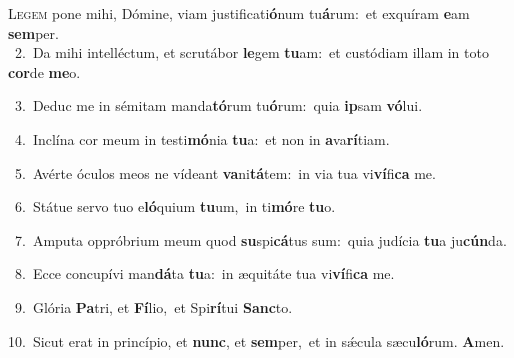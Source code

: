 \lettrine{\initial\textcolor{\initialcolor}{L}}{egem} pone mihi, Dómine, viam justificati\-\textbf{ó}\-num tu\-\textbf{á}\-rum:~\star et exquíram \textbf{e}\-am \textbf{sem}\-per.\\
{\numbfont\textcolor{\numbcolor}{~2.}}~Da mihi intelléctum, et scrutábor \textbf{le}\-gem \textbf{tu}\-am:~\star et custódiam illam in toto \textbf{cor}\-de \textbf{me}\-o.\par
{\numbfont\textcolor{\numbcolor}{~3.}}~Deduc me in sémitam manda\-\textbf{tó}\-rum tu\-\textbf{ó}\-rum:~\star quia \textbf{ip}\-sam \textbf{vó}\-lui.\par
{\numbfont\textcolor{\numbcolor}{~4.}}~Inclína cor meum in testi\-\textbf{mó}\-nia \textbf{tu}\-a:~\star et non in \textbf{a}\-va\-\textbf{rí}\-tiam.\par
{\numbfont\textcolor{\numbcolor}{~5.}}~Avérte óculos meos ne vídeant \textbf{va}\-ni\-\textbf{tá}\-tem:~\star in via tua vi\-\textbf{ví}\-fi\textbf{ca} me.\par
{\numbfont\textcolor{\numbcolor}{~6.}}~Státue servo tuo e\-\textbf{ló}\-quium \textbf{tu}\-um,~\star in ti\-\textbf{mó}\-re \textbf{tu}\-o.\par
{\numbfont\textcolor{\numbcolor}{~7.}}~Amputa oppróbrium meum quod \textbf{su}\-spi\-\textbf{cá}\-tus sum:~\star quia judícia \textbf{tu}\-a ju\-\textbf{cún}\-da.\par
{\numbfont\textcolor{\numbcolor}{~8.}}~Ecce concupívi man\-\textbf{dá}\-ta \textbf{tu}\-a:~\star in æquitáte tua vi\-\textbf{ví}\-fi\textbf{ca} me.\par
{\numbfont\textcolor{\numbcolor}{~9.}}~Glória \textbf{Pa}\-tri, et \textbf{Fí}\-lio,~\star et Spi\-\textbf{rí}\-tui \textbf{Sanc}\-to.\par
{\numbfont\textcolor{\numbcolor}{10.}}~Sicut erat in princípio, et \textbf{nunc}\-, et \textbf{sem}\-per,~\star et in sǽcula sæcu\-\textbf{ló}\-rum. \textbf{A}\-men.\par
